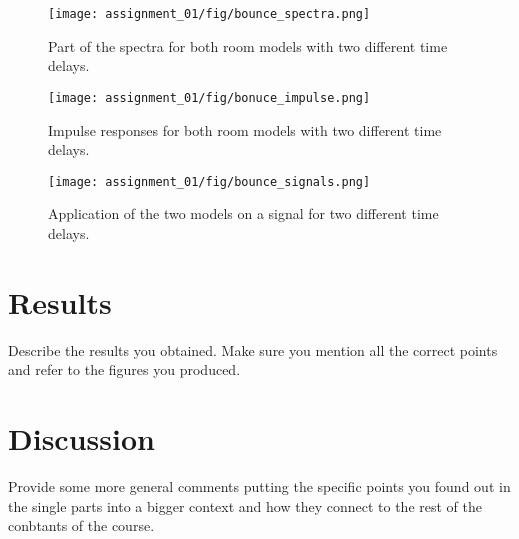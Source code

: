\documentclass[journal]{IEEEtran}
\begin{document}
\begin{figure}
    \centering
    \texttt{[image: assignment\_01/fig/bounce\_spectra.png]}
    \caption{Part of the spectra for both room models with two different time delays.}
    \label{fig:bounce:spectra}
\end{figure}
\begin{figure}
    \centering
    \texttt{[image: assignment\_01/fig/bonuce\_impulse.png]}
    \caption{Impulse responses for both room models with two different time delays.}
    \label{fig:bounce:impulse}
\end{figure}
\begin{figure}
    \centering
    \texttt{[image: assignment\_01/fig/bounce\_signals.png]}
    \caption{Application of the two models on a signal for two different time delays.}
    \label{fig:bounce:signals}
\end{figure}

\clearpage
\newpage



\section{Results}
Describe the results you obtained. Make sure you mention all the correct points and refer to the figures you produced.

\section{Discussion}
Provide some more general comments putting the specific points you found out in the single parts into a bigger context and how they connect to the rest of the conbtants of the course.
\end{document}
